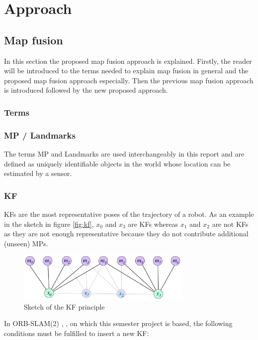 \chapter{Approach}
\label{chap:approach}

\section{Map fusion}
\label{sec:mapmerging}
In this section the proposed map fusion approach is explained. Firstly, the reader will be introduced to the terms needed to explain map fusion in general and the proposed map fusion approach especially. Then the previous map fusion approach is introduced followed by the new proposed approach.

\subsection{Terms}

\subsection{\acf{MP} / Landmarks}
The terms \acf{MP} and Landmarks are used interchangeably in this report and are defined as uniquely identifiable objects in the world whose location can be estimated by a sensor.

\subsection{\acf{KF}}
\acfp{KF} are the most representative poses of the trajectory of a robot. As an example in the sketch in figure \autoref{fig:kf}, $x_0$ and $x_3$ are \acp{KF} whereas $x_1$ and $x_2$ are not \acp{KF} as they are not enough representative because they do not contribute additional (unseen) \acp{MP}.

\begin{figure}[H]
   \centering
   \includegraphics[width=0.75\textwidth]{images/keyframes}
   \caption{Sketch of the \ac{KF} principle}
   \label{fig:kf}
\end{figure}

In ORB-SLAM(2) \cite{Mur-Artal2015}, \cite{Mur-Artal2016}, on which this semester project is based, the following conditions must be fulfilled to insert a new \ac{KF}:

